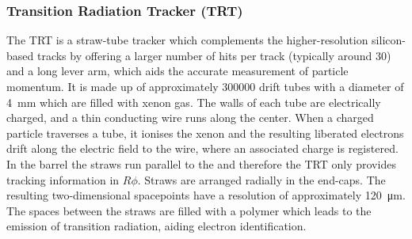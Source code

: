 \subsubsection{Transition Radiation Tracker (TRT)}
The TRT is a straw-tube tracker which complements the higher-resolution silicon-based tracks by offering a larger number of hits per track (typically around 30) and a long lever arm, which aids the accurate measurement of particle momentum. 
It is made up of approximately \num{300000} drift tubes with a diameter of \SI{4}{\milli\meter} which are filled with xenon gas.
The walls of each tube are electrically charged, and a thin conducting wire runs along the center.
When a charged particle traverses a tube, it ionises the xenon and the resulting liberated electrons drift along the electric field to the wire, where an associated charge is registered.
In the barrel the straws run parallel to the  and therefore the TRT only provides tracking information in $R\phi$. Straws are arranged radially in the end-caps. The resulting two-dimensional spacepoints have a resolution of approximately \SI{120}{\micro\meter}.
The spaces between the straws are filled with a polymer which leads to the emission of transition radiation, aiding electron identification.






